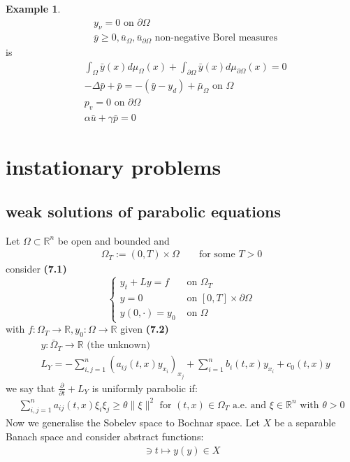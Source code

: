 \documentclass[a4paper,11pt,fleqn]{book}
\theoremstyle{definition}
\newtheorem*{example}{Example}
\theoremstyle{remark}
\begin{document}
\begin{example}
\begin{align*}
	&y_\nu = 0 \text{ on } \partial \Omega\\
	&\bar{y} \ge 0, \bar{u}_\Omega, \bar{u}_{\partial\Omega} \text{ non-negative Borel measures}
\end{align*}
is
\begin{align*}
	&\int_\Omega \bar{y}(x) d\mu_{\Omega}(x) + \int_{\partial\Omega} \bar{y}(x) d\mu_{\partial\Omega}(x) = 0 \\
	&-\Delta \bar{p} + \bar{p} = -(\bar{y} - y_d) + \bar{\mu}_\Omega \text{ on } \Omega \\
	&p_v = 0 \text{ on } \partial \Omega\\
	&\alpha \bar{u} + \gamma \bar{p} = 0 
\end{align*}
\end{example}


\section{instationary problems}
\subsection{weak solutions of parabolic equations}
Let $\Omega \subset \mathbb{R}^n$ be open and bounded and 
\begin{align*}
	\Omega_T := (0, T) \times \Omega \qquad \text{for some } T > 0
\end{align*}
consider \textbf{(7.1)}
\begin{equation*}
\left\{
\begin{aligned}
	y_t + Ly = f &\text{ on } \Omega_T\\
	y= 0 &\text{ on } [0, T] \times \partial\Omega\\
	y(0, \cdot) = y_0 &\text{ on } \Omega
\end{aligned}
\right.
\end{equation*}
with $f : \Omega_T \rightarrow \mathbb{R}, y_0: \Omega \rightarrow \mathbb{R}$ given \textbf{(7.2)}
\begin{align*}
	&y :\bar{\Omega}_T \rightarrow \mathbb{R} \text{ (the unknown) }\\
	&L_Y = -\sum_{i, j = 1}^n (a_{ij}(t, x)y_{x_i})_{x_j} + 
	\sum_{i = 1}^n b_i(t, x) y_{x_i} + c_0(t, x) y
\end{align*}
we say that $\frac{\partial}{\partial t} + L_Y$ is uniformly parabolic if:
\begin{align*}
	\sum_{i,j = 1}^n a_{ij}(t, x) \xi_i \xi_j \geq \theta \|\xi\|^2
	\text{ for } (t, x) \in \Omega_T \text{ a.e. and } \xi \in \mathbb{R}^n \text{ with } \theta > 0 
\end{align*}
Now we generalise the Sobelev space to Bochnar space. Let $X$ be a separable Banach space and consider abstract functions:
\begin{align*}
	[0, T] \ni t  \mapsto y(y) \in X
\end{align*}
\end{document}
